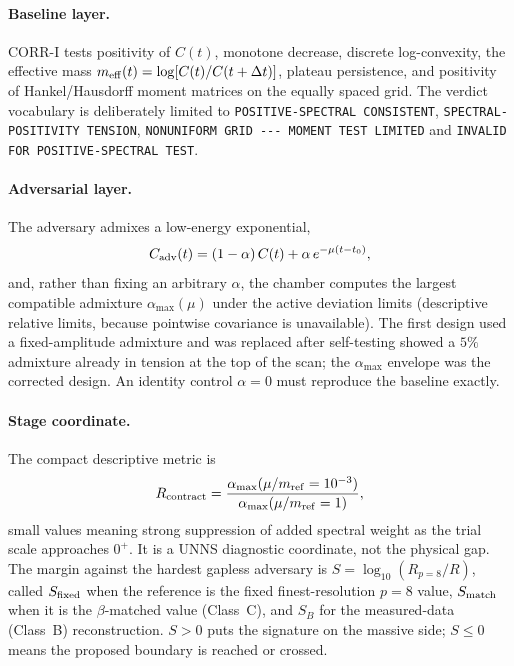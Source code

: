 \documentclass[11pt,a4paper]{article}
\theoremstyle{definition}
\theoremstyle{remark}
\newcommand{\uns}{UNNS}
\begin{document}
\paragraph{Baseline layer.} CORR-I tests positivity of $C(t)$, monotone decrease, discrete log-convexity, the effective mass $m_{\rm eff}(t)=\log[C(t)/C(t+\Delta t)]$, plateau persistence, and positivity of Hankel/Hausdorff moment matrices on the equally spaced grid. The verdict vocabulary is deliberately limited to \texttt{POSITIVE-\allowbreak{}SPECTRAL CONSISTENT}, \texttt{SPECTRAL-\allowbreak{}POSITIVITY TENSION}, \texttt{NONUNIFORM GRID -\allowbreak{}-\allowbreak{}-\allowbreak{} MOMENT TEST LIMITED} and \texttt{INVALID FOR POSITIVE-\allowbreak{}SPECTRAL TEST}.

\paragraph{Adversarial layer.} The adversary admixes a low-energy exponential,
\begin{equation}
C_{\rm adv}(t)=(1-\alpha)\,C(t)+\alpha\,e^{-\mu(t-t_0)},
\end{equation}
and, rather than fixing an arbitrary $\alpha$, the chamber computes the largest compatible admixture $\alpha_{\max}(\mu)$ under the active deviation limits (descriptive relative limits, because pointwise covariance is unavailable). The first design used a fixed-amplitude admixture and was replaced after self-testing showed a $5\%$ admixture already in tension at the top of the scan; the $\alpha_{\max}$ envelope was the corrected design. An identity control $\alpha=0$ must reproduce the baseline exactly.

\paragraph{Stage coordinate.} The compact descriptive metric is
\begin{equation}
R_{\rm contract}=\frac{\alpha_{\max}(\mu/m_{\rm ref}=10^{-3})}{\alpha_{\max}(\mu/m_{\rm ref}=1)},
\end{equation}
small values meaning strong suppression of added spectral weight as the trial scale approaches $0^+$. It is a \uns{} diagnostic coordinate, not the physical gap. The margin against the hardest gapless adversary is $S=\log_{10}(R_{p=8}/R)$, called $S_{\rm fixed}$ when the reference is the fixed finest-resolution $p=8$ value, $S_{\rm match}$ when it is the $\beta$-matched value (Class~C), and $S_B$ for the measured-data (Class~B) reconstruction. $S>0$ puts the signature on the massive side; $S\le0$ means the proposed boundary is reached or crossed.
\end{document}
